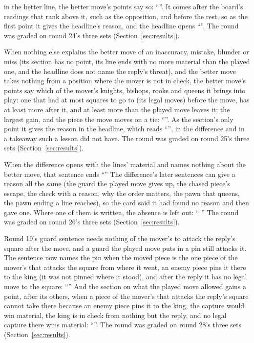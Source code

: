 \documentclass[11pt]{article}
\begin{document}
\begin{description}[style=nextline, nosep]
in the better line, the better move's points say so: ``\RoundTwentyFiveQuote''. It comes after the
board's readings that rank above it, such as the opposition, and before the rest, so as the first
point it gives the headline's reason, and the headline opens ``\RoundTwentyFiveQuoteHeadline''. The
round was graded on round 24's three sets (Section~\ref{sec:results}).
\item[Round 26: the piece the better move brings into play.] When nothing else explains the better
move of an inaccuracy, mistake, blunder or miss (its section has no point, its line ends with no
more material than the played one, and the headline does not name the reply's threat), and the
better move takes nothing from a position where the mover is not in check, the better move's points
say which of the mover's knights, bishops, rooks and queens it brings into play: one that had at
most \RoundTwentySixOutOfPlay{} squares to go to (its legal moves) before the move, has at least
\RoundTwentySixIntoPlay{} more after it, and at least \RoundTwentySixIntoPlay{} more than the played
move leaves it; the largest gain, and the piece the move moves on a tie: ``\RoundTwentySixQuote''.
As the section's only point it gives the reason in the headline, which reads
``\RoundTwentySixQuoteHeadline'', in the difference and in a takeaway such a lesson did not have.
The round was graded on round 25's three sets (Section~\ref{sec:results}).
\item[Round 28: no absence said before a reason.] When the difference opens with the lines'
material and names nothing about the better move, that sentence ends ``\RoundTwentyEightQuoteAbsent''
The difference's later sentences can give a reason all the same (the guard the played move gives
up, the chased piece's escape, the check with a reason, why the order matters, the pawn that
queens, the pawn ending a line reaches), so the card said it had found no reason and then gave
one. Where one of them is written, the absence is left out: ``\RoundTwentyEightQuoteMaterial{}
\RoundTwentyEightQuoteGuard'' The round was graded on round 26's three sets
(Section~\ref{sec:results}).
\item[Round 29: the pin that keeps a piece from taking the reply.] Round 19's guard sentence
needs nothing of the mover's to attack the reply's square after the move, and a guard the played
move puts in a pin still attacks it. The sentence now names the pin when the moved piece is the one
piece of the mover's that attacks the square from where it went, an enemy piece pins it there to the
king (it was not pinned where it stood), and after the reply it has no legal move to the square:
``\RoundTwentyNineQuote'' And the section on what the played move allowed gains a point, after its
others, when a piece of the mover's that attacks the reply's square cannot take there because an
enemy piece pins it to the king, the capture would win material, the king is in check from nothing
but the reply, and no legal capture there wins material: ``\RoundTwentyNineQuoteSafe''. The round
was graded on round 28's three sets (Section~\ref{sec:results}).
\end{description}
\end{document}
